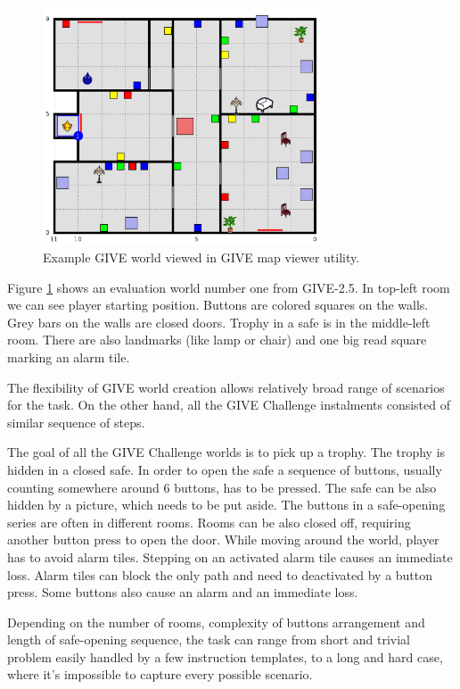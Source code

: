 \begin{figure}[!htbp]
  \centering
	\includegraphics[width=0.75\textwidth]{Images/give-evalworldexmaple}
	\caption{Example GIVE world viewed in GIVE map viewer utility.}
	\label{fig:give-evalworldexmaple}
\end{figure}

Figure \ref{fig:give-evalworldexmaple} shows an evaluation world number one from GIVE-2.5. In top-left room we can see player starting position. Buttons are colored squares on the walls. Grey bars on the walls are closed doors. Trophy in a safe is in the middle-left room. There are also landmarks (like lamp or chair) and one big read square marking an alarm tile.

The flexibility of GIVE world creation allows relatively broad range of scenarios for the task. On the other hand, all the GIVE Challenge instalments consisted of similar sequence of steps.

The goal of all the GIVE Challenge worlds is to pick up a trophy. The trophy is hidden in a closed safe. In order to open the safe a sequence of buttons, usually counting somewhere around 6 buttons, has to be pressed. The safe can be also hidden by a picture, which needs to be put aside. The buttons in a safe-opening series are often in different rooms. Rooms can be also closed off, requiring another button press to open the door. While moving around the world, player has to avoid alarm tiles. Stepping on an activated alarm tile causes an immediate loss. Alarm tiles can block the only path and need to deactivated by a button press. Some buttons also cause an alarm and an immediate loss.

Depending on the number of rooms, complexity of buttons arrangement and length of safe-opening sequence, the task can range from short and trivial problem easily handled by a few instruction templates, to a long and hard case, where it's impossible to capture every possible scenario.

